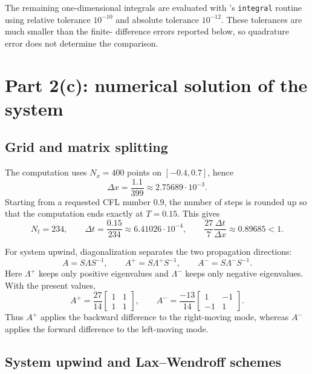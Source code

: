 The remaining one-dimensional integrals are evaluated with \matlab's
\texttt{integral} routine using relative tolerance $10^{-10}$ and absolute
tolerance $10^{-12}$. These tolerances are much smaller than the finite-
difference errors reported below, so quadrature error does not determine the
comparison.

\section{Part 2(c): numerical solution of the system}

\subsection{Grid and matrix splitting}

The computation uses $N_x=400$ points on $[-0.4,0.7]$, hence
\begin{equation}
 \Delta x=\frac{1.1}{399}\approx2.75689\cdot10^{-3}.
\end{equation}
Starting from a requested CFL number $0.9$, the number of steps is rounded up
so that the computation ends exactly at $T=0.15$. This gives
\begin{equation}
 N_t=234,
 \qquad
 \Delta t=\frac{0.15}{234}\approx6.41026\cdot10^{-4},
 \qquad
 \frac{27}{7}\frac{\Delta t}{\Delta x}\approx0.89685<1.
\end{equation}

For system upwind, diagonalization separates the two propagation directions:
\begin{equation}
 A=S\Lambda S^{-1},
 \qquad
 A^+=S\Lambda^+S^{-1},
 \qquad
 A^-=S\Lambda^-S^{-1}.
\end{equation}
Here $\Lambda^+$ keeps only positive eigenvalues and $\Lambda^-$ keeps only
negative eigenvalues. With the present values,
\begin{equation}
 A^+=\frac{27}{14}
 \begin{bmatrix}1&1\\1&1\end{bmatrix},
 \qquad
 A^-=\frac{-13}{14}
 \begin{bmatrix}1&-1\\-1&1\end{bmatrix}.
 \label{eq:part2-matrix-parts}
\end{equation}
Thus $A^+$ applies the backward difference to the right-moving mode, whereas
$A^-$ applies the forward difference to the left-moving mode.

\subsection{System upwind and Lax--Wendroff schemes}

